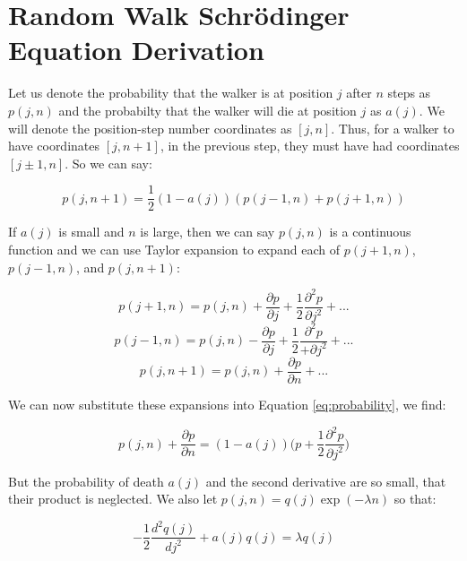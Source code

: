 \documentclass[journal]{IEEEtran}
\begin{document}
\appendices
\section{Random Walk Schr\"{o}dinger Equation Derivation}
\label{appendix:derivation}
Let us denote the probability that the walker is at position $j$ after $n$ steps
as $p(j,n)$ and the probabilty that the walker will die at position $j$ as
$a(j)$. We will denote the position-step number coordinates as $[j, n]$. Thus,
for a walker to have coordinates $[j, n+1]$, in the previous step, they must have
had coordinates $[j \pm 1, n]$. So we can say:

\begin{equation}
  \label{eq:probability}
  p(j, n+1) =  \frac{1}{2}(1-a(j))(p(j-1,n) + p(j+1,n))
\end{equation}

If $a(j)$ is small and $n$ is large, then we can say $p(j, n)$ is a continuous
function and we can use Taylor expansion to expand each of $p(j+1, n)$,
$p(j-1,n)$, and $p(j, n+1)$:

\begin{equation}
  p(j+1, n) = p(j,n) + \frac{\partial p}{\partial j} + \frac{1}{2}
  \frac{\partial^2 p}{\partial j^2} + ...
  \nonumber
\end{equation}
\begin{equation}
  p(j-1, n) = p(j,n) - \frac{\partial p}{\partial j} + \frac{1}{2}
  \frac{\partial^2 p}{+\partial j^2} + ...
  \nonumber
\end{equation}
\begin{equation}
  p(j, n+1) = p(j, n) + \frac{\partial p}{\partial n} + ...
  \nonumber
\end{equation}

We can now substitute these expansions into Equation \ref{eq:probability}, we
find:

\begin{equation}
  p(j, n) + \frac{\partial p}{\partial n} = (1-a(j))\Big(p +
  \frac{1}{2}\frac{\partial^2 p}{\partial j^2}\Big)
  \nonumber
\end{equation}

But the probability of death $a(j)$ and the second derivative are so small, that
their product is neglected. We also let $p(j,n) = q(j) \exp(-\lambda n)$ so that:

\begin{equation}
  -\frac{1}{2} \frac{d^2q(j)}{dj^2} + a(j)q(j) = \lambda q(j)
  \nonumber
\end{equation}

\printbibliography
\end{document}
